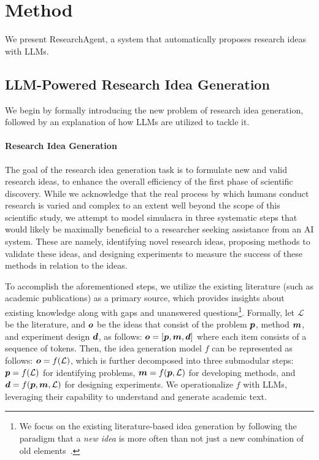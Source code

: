 \section{Method}
We present ResearchAgent, a system that automatically proposes research ideas with LLMs.

\subsection{LLM-Powered Research Idea Generation}
\label{sec:research-idea-gen}

We begin by formally introducing the new problem of research idea generation, followed by an explanation of how LLMs are utilized to tackle it.

\paragraph{Research Idea Generation}
The goal of the research idea generation task is to formulate new and valid research ideas, to enhance the overall efficiency of the first phase of scientific discovery. While we acknowledge that the real process by which humans conduct research is varied and complex to an extent well beyond the scope of this scientific study, we attempt to model simulacra in three systematic steps that would likely be maximally beneficial to a researcher seeking assistance from an AI system. These are namely, identifying novel research ideas, proposing methods to validate these ideas, and designing experiments to measure the success of these methods in relation to the ideas.

To accomplish the aforementioned steps, we utilize the existing literature (such as academic publications) as a primary source, which provides insights about existing knowledge along with gaps and unanswered questions\footnote{We focus on the existing literature-based idea generation by following the paradigm that a \textit{new idea} is more often than not just a new combination of old elements~\cite{young2003technique}.}. Formally, let $\mathcal{L}$ be the literature, and ${\bm{o}}$ be the ideas that consist of the problem ${\bm{p}}$, method ${\bm{m}}$, and experiment design ${\bm{d}}$, as follows: ${\bm{o}} = [{\bm{p}}, {\bm{m}}, {\bm{d}}]$ where each item consists of a sequence of tokens. Then, the idea generation model $f$ can be represented as follows: ${\bm{o}} = f(\mathcal{L})$, which is further decomposed into three submodular steps: ${\bm{p}} = f(\mathcal{L})$ for identifying problems, ${\bm{m}} = f({\bm{p}}, \mathcal{L})$ for developing methods, and ${\bm{d}} = f({\bm{p}}, {\bm{m}}, \mathcal{L})$ for designing experiments. We operationalize $f$ with LLMs, leveraging their capability to understand and generate academic text. 


